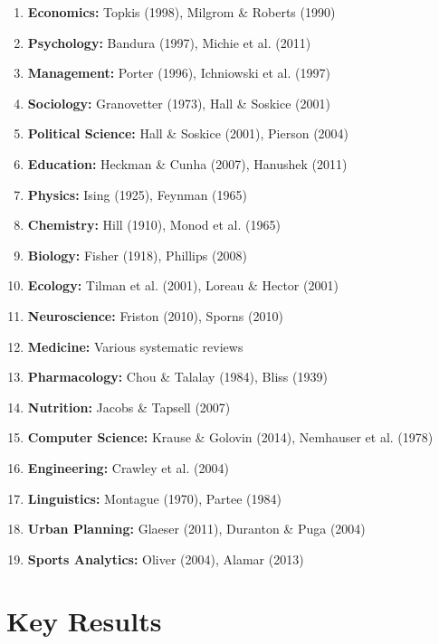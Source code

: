 \begin{enumerate}
    \item \textbf{Economics:} Topkis (1998), Milgrom \& Roberts (1990)
    \item \textbf{Psychology:} Bandura (1997), Michie et al. (2011)
    \item \textbf{Management:} Porter (1996), Ichniowski et al. (1997)
    \item \textbf{Sociology:} Granovetter (1973), Hall \& Soskice (2001)
    \item \textbf{Political Science:} Hall \& Soskice (2001), Pierson (2004)
    \item \textbf{Education:} Heckman \& Cunha (2007), Hanushek (2011)
    \item \textbf{Physics:} Ising (1925), Feynman (1965)
    \item \textbf{Chemistry:} Hill (1910), Monod et al. (1965)
    \item \textbf{Biology:} Fisher (1918), Phillips (2008)
    \item \textbf{Ecology:} Tilman et al. (2001), Loreau \& Hector (2001)
    \item \textbf{Neuroscience:} Friston (2010), Sporns (2010)
    \item \textbf{Medicine:} Various systematic reviews
    \item \textbf{Pharmacology:} Chou \& Talalay (1984), Bliss (1939)
    \item \textbf{Nutrition:} Jacobs \& Tapsell (2007)
    \item \textbf{Computer Science:} Krause \& Golovin (2014), Nemhauser et al. (1978)
    \item \textbf{Engineering:} Crawley et al. (2004)
    \item \textbf{Linguistics:} Montague (1970), Partee (1984)
    \item \textbf{Urban Planning:} Glaeser (2011), Duranton \& Puga (2004)
    \item \textbf{Sports Analytics:} Oliver (2004), Alamar (2013)
\end{enumerate}


\section{Key Results}
\label{sec:cat-results}

